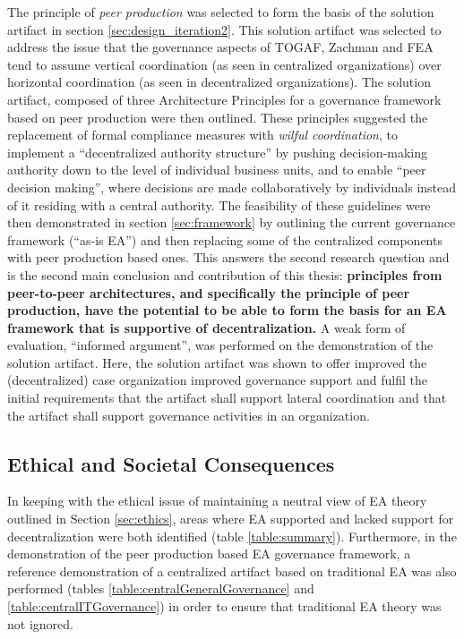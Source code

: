 The principle of \textit{peer production} was selected to form the basis of the solution artifact in section \ref{sec:design_iteration2}. This solution artifact was selected to address the issue that the governance aspects of TOGAF, Zachman and FEA tend to assume vertical coordination (as seen in centralized organizations) over horizontal coordination (as seen in decentralized organizations). The solution artifact, composed of three Architecture Principles for a governance framework based on peer production were then outlined. These principles suggested the replacement of formal compliance measures with \textit{wilful coordination}, to implement a ``decentralized authority structure'' by pushing decision-making authority down to the level of individual business units, and to enable ``peer decision making'', where decisions are made collaboratively by individuals instead of it residing with a central authority. The feasibility of these guidelines were then demonstrated in section \ref{sec:framework} by outlining the current governance framework (``as-is EA'') and then replacing some of the centralized components with peer production based ones. This answers the second research question and is the second main conclusion and contribution of this thesis: \textbf{principles from peer-to-peer architectures, and specifically the principle of peer production, have the potential to be able to form the basis for an EA framework that is supportive of decentralization.} A weak form of evaluation, ``informed argument'', was performed on the demonstration of the solution artifact. Here, the solution artifact was shown to offer improved the (decentralized) case organization improved governance support and fulfil the initial requirements that the artifact shall support lateral coordination and that the artifact shall support governance activities in an organization.


\subsection{Ethical and Societal Consequences}
% 
% 
% 

In keeping with the ethical issue of maintaining a neutral view of EA theory outlined in Section \ref{sec:ethics}, areas where EA supported and lacked support for decentralization were both identified (table \ref{table:summary}). Furthermore, in the demonstration of the peer production based EA governance framework, a reference demonstration of a centralized artifact based on traditional EA was also performed (tables \ref{table:centralGeneralGovernance} and \ref{table:centralITGovernance}) in order to ensure that traditional EA theory was not ignored. 

